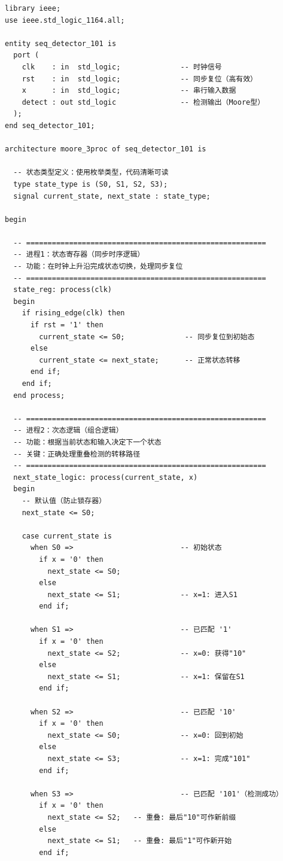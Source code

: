 \begin{lstlisting}[caption={Moore型``101''序列检测器——三进程描述}, label={lst:ans04_fsm}]
library ieee;
use ieee.std_logic_1164.all;

entity seq_detector_101 is
  port (
    clk    : in  std_logic;              -- 时钟信号
    rst    : in  std_logic;              -- 同步复位（高有效）
    x      : in  std_logic;              -- 串行输入数据
    detect : out std_logic               -- 检测输出（Moore型）
  );
end seq_detector_101;

architecture moore_3proc of seq_detector_101 is

  -- 状态类型定义：使用枚举类型，代码清晰可读
  type state_type is (S0, S1, S2, S3);
  signal current_state, next_state : state_type;

begin

  -- ========================================================
  -- 进程1：状态寄存器（同步时序逻辑）
  -- 功能：在时钟上升沿完成状态切换，处理同步复位
  -- ========================================================
  state_reg: process(clk)
  begin
    if rising_edge(clk) then
      if rst = '1' then
        current_state <= S0;              -- 同步复位到初始态
      else
        current_state <= next_state;      -- 正常状态转移
      end if;
    end if;
  end process;

  -- ========================================================
  -- 进程2：次态逻辑（组合逻辑）
  -- 功能：根据当前状态和输入决定下一个状态
  -- 关键：正确处理重叠检测的转移路径
  -- ========================================================
  next_state_logic: process(current_state, x)
  begin
    -- 默认值（防止锁存器）
    next_state <= S0;

    case current_state is
      when S0 =>                         -- 初始状态
        if x = '0' then
          next_state <= S0;
        else
          next_state <= S1;              -- x=1: 进入S1
        end if;

      when S1 =>                         -- 已匹配 '1'
        if x = '0' then
          next_state <= S2;              -- x=0: 获得"10"
        else
          next_state <= S1;              -- x=1: 保留在S1
        end if;

      when S2 =>                         -- 已匹配 '10'
        if x = '0' then
          next_state <= S0;              -- x=0: 回到初始
        else
          next_state <= S3;              -- x=1: 完成"101"
        end if;

      when S3 =>                         -- 已匹配 '101'（检测成功）
        if x = '0' then
          next_state <= S2;   -- 重叠: 最后"10"可作新前缀
        else
          next_state <= S1;   -- 重叠: 最后"1"可作新开始
        end if;


\end{lstlisting}
